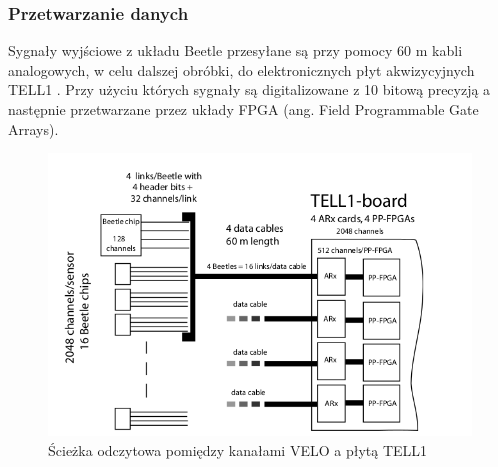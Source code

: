 \subsubsection{Przetwarzanie danych}
Sygnały wyjściowe z układu Beetle przesyłane są przy pomocy 60 m kabli analogowych, w celu dalszej obróbki, do elektronicznych płyt akwizycyjnych TELL1 \cite{Aras}. Przy użyciu których sygnały są digitalizowane z 10 bitową precyzją a następnie przetwarzane przez układy FPGA (ang. Field Programmable Gate Arrays). 
\begin{figure}[ht]
 \centering
 \includegraphics[scale=0.5]{rozdzial2/Velo_schematic.png}
 \caption{Ścieżka odczytowa pomiędzy kanałami VELO a płytą TELL1\cite{Aras}}
\end{figure}





